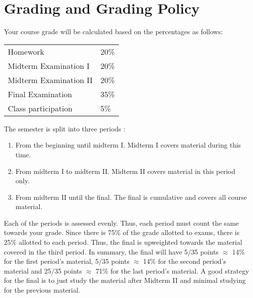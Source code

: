 \section*{Grading and Grading Policy}\label{sec:grading}

Your course grade will be calculated based on the percentages as follows: 

\begin{table}[h]
\centering
\begin{tabular}{l|l}
Homework & 20\% \\
Midterm Examination I & 20\%\\
Midterm Examination II & 20\%\\
Final Examination & 35\% \\
Class participation & 5\%
\end{tabular}
\end{table}
\FloatBarrier

The semester is split into three periods :

\begin{enumerate}
\item From the beginning until midterm I. Midterm I covers material during this time.
\item From midterm I to midterm II. Midterm II covers material in this period only. 
\item From midterm II until the final. The final is cumulative and covers all course material.
\end{enumerate}

Each of the periods is assessed evenly. Thus, each period must count the same towards your grade. Since there is 75\% of the grade allotted to exams, there is 25\% allotted to each period. Thus, the final is upweighted towards the material covered in the third period. In summary, the final will have 5/35 points $\approx$ 14\% for the first period's material, 5/35 points $\approx$ 14\% for the second period's material and 25/35 points $\approx$ 71\% for the last period's material. A good strategy for the final is to just study the material after Midterm II and minimal studying for the previous material.